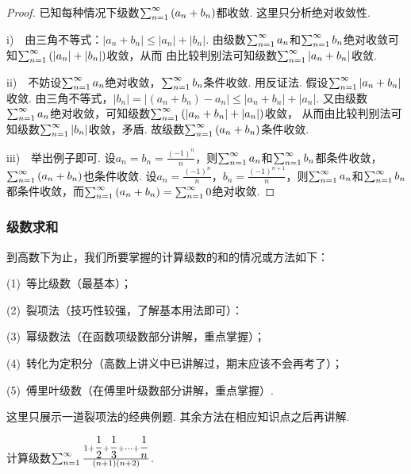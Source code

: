 \begin{proof}
已知每种情况下级数$\ss \left( a_n + b_n \right)$都收敛.
    这里只分析绝对收敛性.

    i)~~由三角不等式：$|a_n + b_n| \le |a_n| + |b_n|$.
    由级数$\ss a_n$和$\ss b_n$绝对收敛可知$\ss \left( |a_n| + |b_n| \right)$收敛，从而
    由比较判别法可知级数$\ss | a_n + b_n |$收敛.

    ii)~~不妨设$\ss a_n$绝对收敛，$\ss b_n$条件收敛. 用反证法.
    假设$\ss |a_n + b_n|$收敛.
    由三角不等式，$|b_n| = |\left( a_n + b_n \right) - a_n| \le |a_n + b_n| + |a_n|$.
    又由级数$\ss a_n$绝对收敛，可知级数$\ss \left( |a_n + b_n| + |a_n| \right)$收敛，
    从而由比较判别法可知级数$\ss |b_n|$收敛，矛盾.
    故级数$\ss \left( a_n + b_n \right)$条件收敛.

    iii)~~举出例子即可.
    设$a_n = b_n = \frac{(-1)^n}{n}$，则$\ss a_n$和$\ss b_n$都条件收敛，$\ss \left( a_n + b_n\right)$也条件收敛.
    设$a_n = \frac{(-1)^n}{n}$，$b_n = \frac{(-1)^{n+1}}{n}$，则$\ss a_n$和$\ss b_n$都条件收敛，而$\ss \left( a_n + b_n\right) = \ss 0$绝对收敛.
\end{proof}

\subsubsection{级数求和}
到高数下为止，我们所要掌握的计算级数的和的情况或方法如下：

(1)~等比级数（最基本）；\par
(2)~裂项法（技巧性较强，了解基本用法即可）：\par
(3)~幂级数法（在函数项级数部分讲解，重点掌握）；\par
(4)~转化为定积分（高数上讲义中已讲解过，期末应该不会再考了）；\par
(5)~傅里叶级数（在傅里叶级数部分讲解，重点掌握）.

这里只展示一道裂项法的经典例题.
其余方法在相应知识点之后再讲解.

\begin{example}
\label{ex:ch10-10}
计算级数$\ss \frac{1+\dfrac{1}{2} + \dfrac{1}{3} + \cdots + \dfrac{1}{n}}{(n+1)(n+2)}$.
\end{example}

